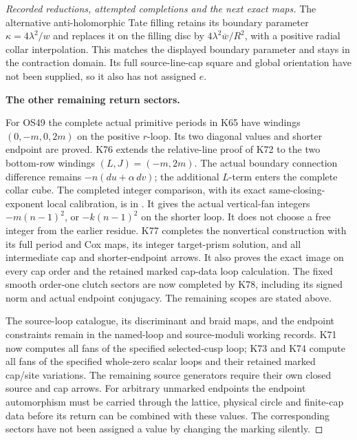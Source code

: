 \begin{proof}[Recorded reductions, attempted completions and the next exact maps]
The alternative anti-holomorphic Tate filling retains its
boundary parameter \(\kappa=4\lambda^2/w\) and replaces
it on the filling disc by
\(4\lambda^2\overline w/R^2\), with a positive radial
collar interpolation. This matches the displayed boundary
parameter and stays in the contraction domain. Its full
source-line-cap square and global orientation have not
been supplied, so it also has not assigned \(e\).

\par\medskip\noindent\textbf{The other remaining return sectors.}\par\nopagebreak[4]
For OS49 the complete actual primitive periods in K65 have
windings \((0,-m,0,2m)\) on the positive \(r\)-loop.
Its two diagonal values and shorter endpoint are proved.
K76 extends the relative-line proof of K72 to the two
bottom-row windings \((L,J)=(-m,2m)\).
The actual boundary connection difference remains
\(-n(du+\alpha\,dv)\); the additional \(L\)-term enters
the complete collar cube. The completed integer comparison,
with its exact same-closing-exponent local calibration, is in
.
It gives the actual vertical-fan integers
\(-m(n-1)^2\), or \(-k(n-1)^2\) on the shorter loop.
It does not choose a free integer from the earlier residue.
K77 completes the nonvertical construction with its full
period and Cox maps, its integer target-prism solution,
and all intermediate cap and shorter-endpoint arrows.
It also proves the exact image on every cap order and
the retained marked cap-data loop calculation. The
fixed smooth order-one clutch sectors are now completed
by K78, including its signed norm and actual endpoint conjugacy.
The remaining scopes are stated above.

The source-loop catalogue, its discriminant and braid maps,
and the endpoint constraints remain in the named-loop and
source-moduli working records. K71 now computes all fans of
the specified selected-cusp loop; K73 and K74 compute all
fans of the specified whole-zero scalar loops and their
retained marked cap/site variations. The remaining source
generators require their own closed source and cap arrows.
For arbitrary unmarked endpoints the endpoint automorphism
must be carried through the lattice, physical circle and
finite-cap data before its return can be combined with
these values. The corresponding sectors have not been
assigned a value by changing the marking silently.
\end{proof}

